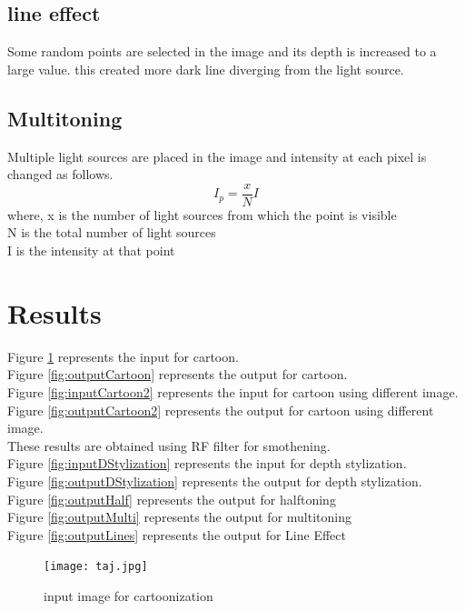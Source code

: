 \documentclass[conference]{IEEEtran}
\begin{document}
  \subsection{line effect}
   Some random points are selected in the image and its depth is increased to a large value. this created more dark line diverging from the light source.
   
   \subsection{Multitoning}
   Multiple light sources are placed in the image and intensity at each pixel is changed as follows.
   $$I_p = \frac{x}{N}I$$
   where, x is the number of light sources from which the point is visible\\
   N is the total number of light sources\\
   I is the intensity at that point\\ 
 
 \section{Results}
 Figure \ref{fig:inputCartoon} represents the input for cartoon.\\
 Figure \ref{fig:outputCartoon} represents the output for cartoon.\\
  Figure \ref{fig:inputCartoon2} represents the input for cartoon using different image.\\
 Figure \ref{fig:outputCartoon2} represents the output for cartoon using different image.\\
 These results are obtained using RF filter for smothening. \\
 Figure \ref{fig:inputDStylization} represents the input for depth stylization.\\
  Figure \ref{fig:outputDStylization} represents the output for depth stylization.\\
  Figure \ref{fig:outputHalf} represents the output for halftoning\\
 Figure \ref{fig:outputMulti} represents the output for multitoning\\
 Figure \ref{fig:outputLines} represents the output for Line Effect\\
 
 
 
 \begin{figure}[h]
 	\texttt{[image: taj.jpg]}
 	\caption{input image for cartoonization}
 	\label{fig:inputCartoon}
 \end{figure}
\end{document}
